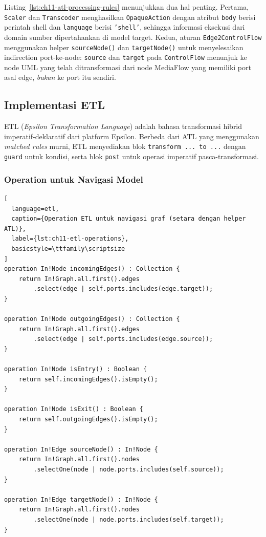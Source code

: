 \noindent Listing~\ref{lst:ch11-atl-processing-rules} menunjukkan dua hal penting. Pertama, \texttt{Scaler} dan \texttt{Transcoder} menghasilkan \texttt{OpaqueAction} dengan atribut \texttt{body} berisi perintah shell dan \texttt{language} berisi \texttt{'shell'}, sehingga informasi eksekusi dari domain sumber dipertahankan di model target. Kedua, aturan \texttt{Edge2ControlFlow} menggunakan helper \texttt{sourceNode()} dan \texttt{targetNode()} untuk menyelesaikan indirection port-ke-node: \texttt{source} dan \texttt{target} pada \texttt{ControlFlow} menunjuk ke node UML yang telah ditransformasi dari node MediaFlow yang memiliki port asal edge, \textit{bukan} ke port itu sendiri.

\subsection{Implementasi ETL}

ETL (\textit{Epsilon Transformation Language}) adalah bahasa transformasi hibrid imperatif-deklaratif dari platform Epsilon. Berbeda dari ATL yang menggunakan \textit{matched rules} murni, ETL menyediakan blok \texttt{transform ... to ...} dengan \texttt{guard} untuk kondisi, serta blok \texttt{post} untuk operasi imperatif pasca-transformasi.

\subsubsection{Operation untuk Navigasi Model}

\begin{lstlisting}[
  language=etl,
  caption={Operation ETL untuk navigasi graf (setara dengan helper ATL)},
  label={lst:ch11-etl-operations},
  basicstyle=\ttfamily\scriptsize
]
operation In!Node incomingEdges() : Collection {
    return In!Graph.all.first().edges
        .select(edge | self.ports.includes(edge.target));
}

operation In!Node outgoingEdges() : Collection {
    return In!Graph.all.first().edges
        .select(edge | self.ports.includes(edge.source));
}

operation In!Node isEntry() : Boolean {
    return self.incomingEdges().isEmpty();
}

operation In!Node isExit() : Boolean {
    return self.outgoingEdges().isEmpty();
}

operation In!Edge sourceNode() : In!Node {
    return In!Graph.all.first().nodes
        .selectOne(node | node.ports.includes(self.source));
}

operation In!Edge targetNode() : In!Node {
    return In!Graph.all.first().nodes
        .selectOne(node | node.ports.includes(self.target));
}
\end{lstlisting}

